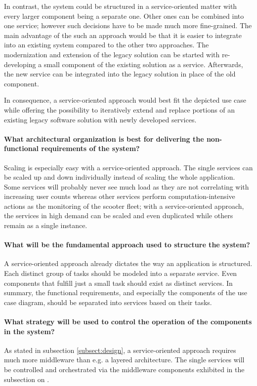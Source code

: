 \documentclass[12pt,a4paper,twoside]{report}
\begin{document}
In contrast, the system could be structured in a service-oriented matter with
every larger component being a separate one. Other ones can be combined into
one service; however such decisions have to be made much more fine-grained.
The main advantage of the such an approach would be that it is easier to
integrate into an existing system compared to the other two approaches.
The modernization and extension of the legacy solution can be started with
re-developing a small component of the existing solution as a service.
Afterwards, the new service can be integrated into the legacy solution
in place of the old component.

In consequence, a service-oriented approach would best fit the depicted use case
while offering the possibility to iteratively extend and replace portions of
an existing legacy software solution with newly developed services.

\paragraph{What architectural organization is best for delivering the non-functional requirements of the system?}
Scaling is especially easy with a service-oriented approach. The single services
can be scaled up and down individually instead of scaling the whole application.
Some services will probably never see much load as they are not correlating with
increasing user counts whereas other services perform computation-intensive
actions as the monitoring of the scooter fleet; with a service-oriented approach,
the services in high demand can be scaled and even duplicated while others
remain as a single instance.

\paragraph{What will be the fundamental approach used to structure the system?}
A service-oriented approach already dictates the way an application is structured.
Each distinct group of tasks should be modeled into a separate service.
Even components that fulfill just a small task should exist as distinct services.
In summary, the functional requirements, and especially the components of
the use case diagram, should be separated into services based on their tasks.

\paragraph{What strategy will be used to control the operation of the components in the system?}
As stated in subsection \ref{subsect:design}, a service-oriented approach
requires much more middleware than e.g. a layered architecture.
The single services will be controlled and orchestrated via the middleware components
exhibited in the subsection on \textit{}.
\end{document}
